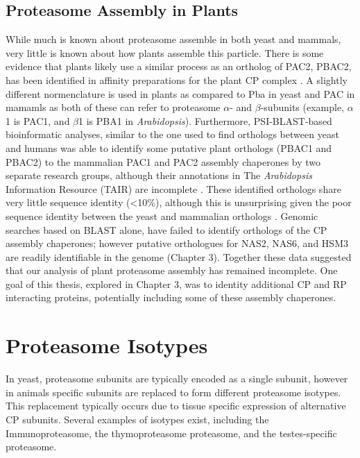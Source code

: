 \subsection{Proteasome Assembly in Plants}
	While much is known about proteasome assemble in both yeast and mammals, very little is known about how plants assemble this particle. There is some evidence that plants likely use a similar process as an ortholog of PAC2, PBAC2, has been identified in affinity preparations for the plant CP complex \citep{book10}. A slightly different normenclature is used in plants as compared to Pba in yeast and PAC in mamamls as both of these can refer to proteasome $\alpha$- and $\beta$-subunits (example, $\alpha$1 is PAC1, and $\beta$1 is PBA1 in \textit{Arabidopsis}). Furthermore, PSI-BLAST-based bioinformatic analyses, similar to the one used to find orthologs between yeast and humans was able to identify some putative plant orthologs (PBAC1 and PBAC2) to the mammalian PAC1 and PAC2 assembly chaperones by two separate research groups, although their annotations in The \textit{Arabidopsis} Information Resource (TAIR) are incomplete \citep{kusmierczyk11, le07}. These identified orthologs share very little sequence identity (<10\%), although this is unsurprising given the poor sequence identity between the yeast and mammalian orthologs \citep{kusmierczyk11, le07, murata09}.  Genomic searches based on BLAST alone, have failed to identify orthologs of the CP assembly chaperones; however putative orthologues for NAS2, NAS6, and HSM3 are readily identifiable in the genome (Chapter 3).  Together these data suggested that our analysis of plant proteasome assembly has remained incomplete. One goal of this thesis, explored in Chapter 3, was to identity additional CP and RP interacting proteins, potentially including some of these assembly chaperones.

\section{Proteasome Isotypes}
	In yeast, proteasome subunits are typically encoded as a single subunit, however in animals specific subunits are replaced to form different proteasome isotypes. This replacement typically occurs due to tissue specific expression of alternative CP subunits. Several examples of isotypes exist, including the Immunoproteasome, the thymoproteasome proteasome, and the testes-specific proteasome.

